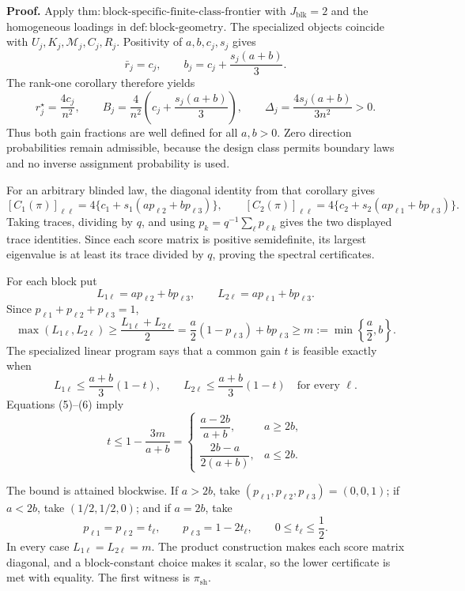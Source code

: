 \textbf{Proof.}
Apply \(\mathrm{thm:block\text{-}specific\text{-}finite\text{-}class\text{-}frontier}\) with \(J_{\mathrm{blk}}=2\) and the homogeneous loadings in \(\mathrm{def:block\text{-}geometry}\). The specialized objects coincide with \(U_j,K_j,\mathcal M_j,C_j,R_j\). Positivity of \(a,b,c_j,s_j\) gives
\[
\bar r_j=c_j,
\qquad
b_j=c_j+\frac{s_j(a+b)}3.
\tag{1}
\]
The rank-one corollary therefore yields
\[
r_j^\star=\frac{4c_j}{n^2},
\qquad
B_j=\frac4{n^2}\left(c_j+\frac{s_j(a+b)}3\right),
\qquad
\Delta_j=\frac{4s_j(a+b)}{3n^2}>0.
\tag{2}
\]
Thus both gain fractions are well defined for all \(a,b>0\).  Zero direction probabilities remain admissible, because the design class permits boundary laws and no inverse assignment probability is used.

For an arbitrary blinded law, the diagonal identity from that corollary gives
\[
[C_1(\pi)]_{\ell\ell}
=4\{c_1+s_1(ap_{\ell2}+bp_{\ell3})\},
\qquad
[C_2(\pi)]_{\ell\ell}
=4\{c_2+s_2(ap_{\ell1}+bp_{\ell3})\}.
\tag{3}
\]
Taking traces, dividing by \(q\), and using \(p_k=q^{-1}\sum_\ell p_{\ell k}\) gives the two displayed trace identities.  Since each score matrix is positive semidefinite, its largest eigenvalue is at least its trace divided by \(q\), proving the spectral certificates.

For each block put
\[
L_{1\ell}=ap_{\ell2}+bp_{\ell3},
\qquad
L_{2\ell}=ap_{\ell1}+bp_{\ell3}.
\tag{4}
\]
Since \(p_{\ell1}+p_{\ell2}+p_{\ell3}=1\),
\[
\max(L_{1\ell},L_{2\ell})
\ge\frac{L_{1\ell}+L_{2\ell}}2
=\frac a2(1-p_{\ell3})+bp_{\ell3}
\ge m:=\min\left\{\frac a2,b\right\}.
\tag{5}
\]
The specialized linear program says that a common gain \(t\) is feasible exactly when
\[
L_{1\ell}\le\frac{a+b}{3}(1-t),
\qquad
L_{2\ell}\le\frac{a+b}{3}(1-t)
\quad\text{for every }\ell.
\tag{6}
\]
Equations (5)--(6) imply
\[
t\le1-\frac{3m}{a+b}
=
\begin{cases}
\dfrac{a-2b}{a+b},&a\ge2b,\\[6pt]
\dfrac{2b-a}{2(a+b)},&a\le2b.
\end{cases}
\tag{7}
\]

The bound is attained blockwise. If \(a>2b\), take \((p_{\ell1},p_{\ell2},p_{\ell3})=(0,0,1)\); if \(a<2b\), take \((1/2,1/2,0)\); and if \(a=2b\), take
\[
p_{\ell1}=p_{\ell2}=t_\ell,
\qquad
p_{\ell3}=1-2t_\ell,
\qquad
0\le t_\ell\le\frac12.
\tag{8}
\]
In every case \(L_{1\ell}=L_{2\ell}=m\). The product construction makes each score matrix diagonal, and a block-constant choice makes it scalar, so the lower certificate is met with equality. The first witness is \(\pi_{\mathrm{sh}}\).

